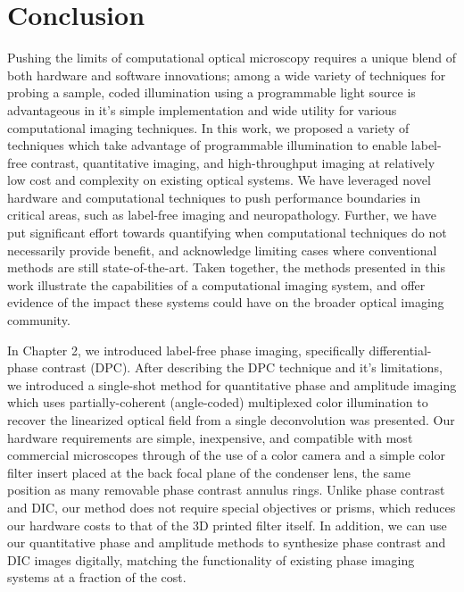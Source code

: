 \chapter{Conclusion}
Pushing the limits of computational optical microscopy requires a unique blend of both hardware and software innovations; among a wide variety of techniques for probing a sample, coded illumination using a programmable light source is advantageous in it's simple implementation and wide utility for various computational imaging techniques. In this work, we proposed a variety of techniques which take advantage of programmable illumination to enable label-free contrast, quantitative imaging, and high-throughput imaging at relatively low cost and complexity on existing optical systems. We have leveraged novel hardware and computational techniques to push performance boundaries in critical areas, such as label-free imaging and neuropathology. Further, we have put significant effort towards quantifying when computational techniques do not necessarily provide benefit, and acknowledge limiting cases where conventional methods are still state-of-the-art. Taken together, the methods presented in this work illustrate the capabilities of a computational imaging system, and offer evidence of the impact these systems could have on the broader optical imaging community.

In Chapter 2, we introduced label-free phase imaging, specifically differential-phase contrast (DPC). After describing the DPC technique and it's limitations, we introduced a single-shot method for quantitative phase and amplitude imaging which uses partially-coherent (angle-coded) multiplexed color illumination to recover the linearized optical field from a single deconvolution was presented. Our hardware requirements are simple, inexpensive, and compatible with most commercial microscopes through of the use of a color camera and a simple color filter insert placed at the back focal plane of the condenser lens, the same position as many removable phase contrast annulus rings. Unlike phase contrast and DIC, our method does not require special objectives or prisms, which reduces our hardware costs to that of the 3D printed filter itself. In addition, we can use our quantitative phase and amplitude methods to synthesize phase contrast and DIC images digitally, matching the functionality of existing phase imaging systems at a fraction of the cost.

